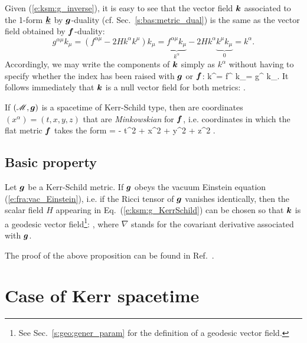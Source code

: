 Given (\ref{e:ksm:g_inverse}), it is easy to see that the vector field
$\bm{k}$ associated
to the 1-form $\underline{\bm{k}}$ by $\bm{g}$-duality (cf. Sec.~\ref{s:bas:metric_dual})
is the same as the vector field
obtained by $\bm{f}$-duality:
\[
    g^{\alpha\mu} k_\mu = (f^{\alpha\mu} - 2 H k^\alpha k^\mu) k_\mu
                        = \underbrace{f^{\alpha\mu} k_\mu}_{k^\alpha}
                          - 2H k^\alpha \underbrace{k^\mu k_\mu}_{0}
                        = k^\alpha .
\]
Accordingly, we may write the components of $\bm{k}$ simply as $k^\alpha$
without having to specify whether the index has been raised with $\bm{g}$ or $\bm{f}$:
\be
    k^\alpha = f^{\alpha\mu} k_\mu  = g^{\alpha\mu} k_\mu .
\ee
It follows immediately that $\bm{k}$ is a null vector field for
both metrics:
\be
   .
\ee


If $(\mathscr{M},\bm{g})$ is a spacetime of Kerr-Schild type, then 
are coordinates $(x^\alpha) = (t,x,y,z)$ that are \emph{Minkowskian}
for $\bm{f}$, i.e. coordinates in which the flat metric
$\bm{f}$ takes the form
\be \label{e:ksm:ds_eta}
     = - \dd t^2 + \dd x^2 + \dd y^2 + \dd z^2 .
\ee

\subsection{Basic property}

\begin{prop}
Let $\bm{g}$ be a Kerr-Schild metric.
If $\bm{g}$ obeys the vacuum Einstein
equation
(\ref{e:fra:vac_Einstein}),
i.e. if the Ricci tensor of $\bm{g}$ vanishes identically,
then the scalar field $H$ appearing in Eq.~(\ref{e:ksm:g_KerrSchild})
can be chosen so that $\bm{k}$ is a geodesic vector field\footnote{See Sec.~\ref{s:geo:gener_param} for the definition of a geodesic vector field.}:
\be \label{e:ksm:k_geodesic}
    ,
\ee
where $\nabla$ stands for the covariant derivative associated with $\bm{g}$.
\end{prop}

The proof of the above proposition can be found in Ref.~\cite{KerrS65}.



\section{Case of Kerr spacetime}

